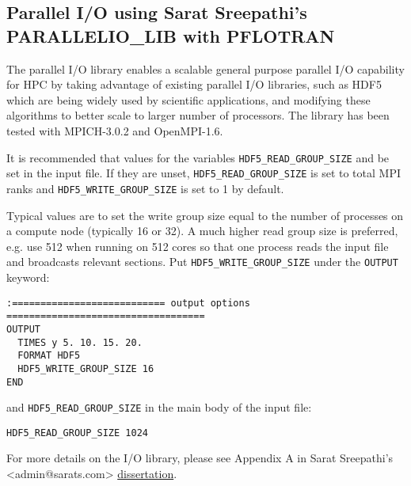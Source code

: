 \subsection{Parallel I/O using Sarat Sreepathi's PARALLELIO\_LIB with PFLOTRAN}
\label{parallelio}

The parallel I/O library enables a scalable general purpose parallel I/O capability for HPC by taking advantage of existing parallel I/O libraries, such as HDF5 which are being widely used by scientific applications, and modifying these algorithms to better scale to larger number of processors. The library has been tested with MPICH-3.0.2 and OpenMPI-1.6.

\normalsize
It is recommended that values for the variables {\footnotesize\tt HDF5\_READ\_GROUP\_SIZE} and  be set in the input file. 
If they are unset, {\footnotesize\tt HDF5\_READ\_GROUP\_SIZE} is set to total MPI ranks and {\footnotesize\tt HDF5\_WRITE\_GROUP\_SIZE} is set to 1 by default.

Typical values are to set the write group size equal to the number of processes on a compute node (typically 16 or 32). 
A much higher read group size is preferred, e.g. use 512 when running on 512 cores so that one process reads the input file and broadcasts relevant sections.
Put {\footnotesize\tt HDF5\_WRITE\_GROUP\_SIZE} under the {\footnotesize\tt OUTPUT} keyword:
\footnotesize
\begin{Verbatim}
:=========================== output options ===================================
OUTPUT
  TIMES y 5. 10. 15. 20.
  FORMAT HDF5
  HDF5_WRITE_GROUP_SIZE 16
END
\end{Verbatim}
\normalsize
and {\footnotesize\tt HDF5\_READ\_GROUP\_SIZE} in the main body of the input file:
\footnotesize
\begin{Verbatim}
HDF5_READ_GROUP_SIZE 1024
\end{Verbatim}
\normalsize

For more details on the I/O library, please see Appendix A in Sarat Sreepathi's \linebreak <admin@sarats.com> \href{http://www.lib.ncsu.edu/resolver/1840.16/8317}{dissertation}.


